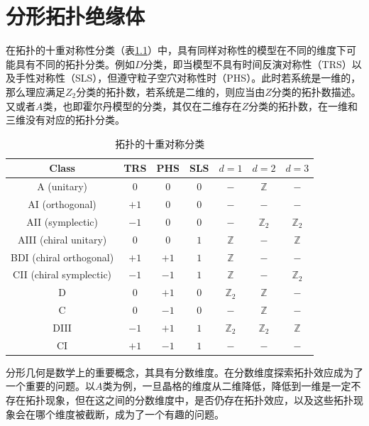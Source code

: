 \chapter{分形拓扑绝缘体}
在拓扑的十重对称性分类（表\ref{tab:tenfold}）中，具有同样对称性的模型在不同的维度下可能具有不同的拓扑分类。例如$D$分类，即当模型不具有时间反演对称性（TRS）以及手性对称性（SLS），但遵守粒子空穴对称性时（PHS）。此时若系统是一维的，那么理应满足$Z_2$分类的拓扑数，若系统是二维的，则应当由$Z$分类的拓扑数描述。又或者$A$类，也即霍尔丹模型的分类，其仅在二维存在$Z$分类的拓扑数，在一维和三维没有对应的拓扑分类。

\begin{table}[h!]
\centering
\begin{tabular}{|c|c|c|c|c|c|c|}
\hline
Class & TRS & PHS & SLS & $d=1$ & $d=2$ & $d=3$ \\ \hline
A (unitary) & $0$ & $0$ & $0$ & $-$ & $\mathbb{Z}$ & $-$ \\ \hline
AI (orthogonal) & $+1$ & $0$ & $0$ & $-$ & $-$ & $-$ \\ \hline
AII (symplectic) & $-1$ & $0$ & $0$ & $-$ & $\mathbb{Z}_2$ & $\mathbb{Z}_2$ \\ \hline
AIII (chiral unitary) & $0$ & $0$ & $1$ & $\mathbb{Z}$ & $-$ & $\mathbb{Z}$ \\ \hline
BDI (chiral orthogonal) & $+1$ & $+1$ & $1$ & $\mathbb{Z}$ & $-$ & $-$ \\ \hline
CII (chiral symplectic) & $-1$ & $-1$ & $1$ & $\mathbb{Z}$ & $-$ & $\mathbb{Z}_2$ \\ \hline
D & $0$ & $+1$ & $0$ & $\mathbb{Z}_2$ & $\mathbb{Z}$ & $-$ \\ \hline
C & $0$ & $-1$ & $0$ & $-$ & $\mathbb{Z}$ & $-$ \\ \hline
DIII & $-1$ & $+1$ & $1$ & $\mathbb{Z}_2$ & $\mathbb{Z}_2$ & $\mathbb{Z}$ \\ \hline
CI & $+1$ & $-1$ & $1$ & $-$ & $-$ & $-$ \\ \hline
\end{tabular}
\caption{拓扑的十重对称分类}
\label{tab:tenfold}
\end{table}

分形几何是数学上的重要概念，其具有分数维度。在分数维度探索拓扑效应成为了一个重要的问题。以$A$类为例，一旦晶格的维度从二维降低，降低到一维是一定不存在拓扑现象，但在这之间的分数维度中，是否仍存在拓扑效应，以及这些拓扑现象会在哪个维度被截断，成为了一个有趣的问题。
